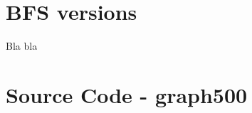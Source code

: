 \documentclass[12pt,a4paper]{article}
\begin{document}
\nocite{*}


\clearpage
\appendix
\section{BFS versions}
\label{sec:versions}
Bla bla
\section{Source Code - graph500}
\label{sec:sourcecode}

\clearpage

\clearpage


\clearpage
\end{document}

